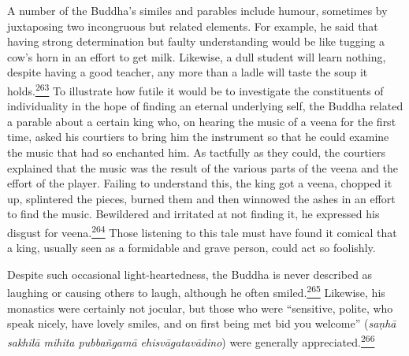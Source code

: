 A number of the Buddha's similes and parables include humour, sometimes
by juxtaposing two incongruous but related elements. For example, he
said that having strong determination but faulty understanding would be
like tugging a cow's horn in an effort to get milk. Likewise, a dull
student will learn nothing, despite having a good teacher, any more than
a ladle will taste the soup it
holds.\label{footprints_split_010.html_fnref263}\hyperref[footprints_split_024.htmlux5cux23fn263]{\textsuperscript{263}}
To illustrate how futile it would be to investigate the constituents of
individuality in the hope of finding an eternal underlying self, the
Buddha related a parable about a certain king who, on hearing the music
of a veena for the first time, asked his courtiers to bring him the
instrument so that he could examine the music that had so enchanted him.
As tactfully as they could, the courtiers explained that the music was
the result of the various parts of the veena and the effort of the
player. Failing to understand this, the king got a veena, chopped it up,
splintered the pieces, burned them and then winnowed the ashes in an
effort to find the music. Bewildered and irritated at not finding it, he
expressed his disgust for
veena.\label{footprints_split_010.html_fnref264}\hyperref[footprints_split_024.htmlux5cux23fn264]{\textsuperscript{264}}
Those listening to this tale must have found it comical that a king,
usually seen as a formidable and grave person, could act so foolishly.

Despite such occasional light-heartedness, the Buddha is never described
as laughing or causing others to laugh, although he often
smiled.\label{footprints_split_010.html_fnref265}\hyperref[footprints_split_024.htmlux5cux23fn265]{\textsuperscript{265}}
Likewise, his monastics were certainly not jocular, but those who were
``sensitive, polite, who speak nicely, have lovely smiles, and on first
being met bid you welcome'' (\emph{saṇhā sakhilā mihita pubbañgamā
ehisvāgatavādino}) were generally
appreciated.\label{footprints_split_010.html_fnref266}\hyperref[footprints_split_024.htmlux5cux23fn266]{\textsuperscript{266}}

